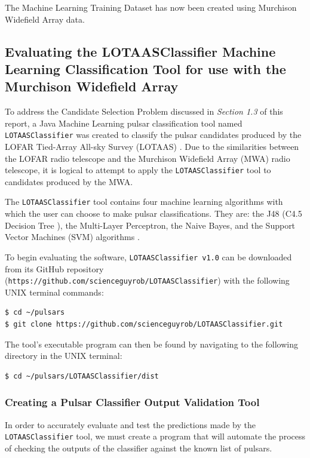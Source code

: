 \documentclass{article}
\begin{document}
The Machine Learning Training Dataset has now been created using Murchison Widefield Array data.
    
\subsection{Evaluating the LOTAASClassifier Machine Learning Classification Tool for use with the Murchison Widefield Array}

To address the Candidate Selection Problem discussed in \emph{Section 1.3} of this report, a Java Machine Learning pulsar classification tool named \verb|LOTAASClassifier| was created to classify the pulsar candidates produced by the LOFAR Tied-Array All-sky Survey (LOTAAS) \autocite{lyon}. Due to the similarities between the LOFAR radio telescope and the Murchison Widefield Array (MWA) radio telescope, it is logical to attempt to apply the \verb|LOTAASClassifier| tool to candidates produced by the MWA.

The \verb|LOTAASClassifier| tool contains four machine learning algorithms with which the user can choose to make pulsar classifications. They are: the J48 (C4.5 Decision Tree \autocite{quinlan}), the Multi-Layer Perceptron, the Naive Bayes, and the Support Vector Machines (SVM) algorithms \autocite{lyon}.

To begin evaluating the software, \verb|LOTAASClassifier v1.0| can be downloaded from its GitHub repository \\(\verb|https://github.com/scienceguyrob/LOTAASClassifier|) with the following UNIX terminal commands:

\begin{lstlisting}[numbers=none]
$ cd ~/pulsars
$ git clone https://github.com/scienceguyrob/LOTAASClassifier.git
\end{lstlisting}

The tool's executable program can then be found by navigating to the following directory in the UNIX terminal:

\begin{lstlisting}[numbers=none]
$ cd ~/pulsars/LOTAASClassifier/dist
\end{lstlisting}

\subsubsection{Creating a Pulsar Classifier Output Validation Tool}
\label{sec:methodvalidate}
In order to accurately evaluate and test the predictions made by the \verb|LOTAASClassifier| tool, we must create a program that will automate the process of checking the outputs of the classifier against the known list of pulsars.
\end{document}

